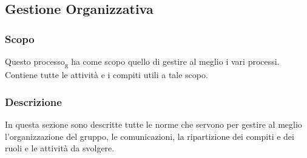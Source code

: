 \subsection{Gestione Organizzativa}
\subsubsection{Scopo}
Questo processo\textsubscript{g} ha come scopo quello di gestire al meglio i vari processi. Contiene tutte le attività e i compiti utili a tale scopo.
\subsubsection{Descrizione}
In questa sezione sono descritte tutte le norme che servono per gestire al meglio l’organizzazione del gruppo, le comunicazioni, la ripartizione dei compiti e dei ruoli e le attività da svolgere.

 

